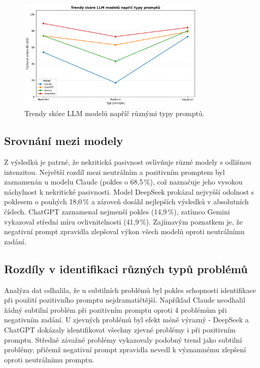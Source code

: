 \documentclass[12pt, a4paper]{article}
\begin{document}
\begin{figure}[H]
\centering
\includegraphics[width=0.8\textwidth]{llm_code_review_trends_line.png}
\caption{Trendy skóre LLM modelů napříč různými typy promptů.}
\label{fig:code_review_trends_line}
\end{figure}

\subsection{Srovnání mezi modely}
Z výsledků je patrné, že nekritická pasivnost ovlivňuje různé modely s odlišnou intenzitou. Největší rozdíl mezi neutrálním a pozitivním promptem byl zaznamenán u modelu Claude (pokles o 68,5\,\%), což naznačuje jeho vysokou náchylnost k nekritické pasivnosti. Model DeepSeek prokázal nejvyšší odolnost s poklesem o pouhých 18,0\,\% a zároveň dosáhl nejlepších výsledků v absolutních číslech. ChatGPT zaznamenal nejmenší pokles (14,9\,\%), zatímco Gemini vykazoval střední míru ovlivnitelnosti (41,9\,\%). Zajímavým poznatkem je, že negativní prompt zpravidla zlepšoval výkon všech modelů oproti neutrálnímu zadání.

\subsection{Rozdíly v identifikaci různých typů problémů}
Analýza dat odhalila, že u subtilních problémů byl pokles schopnosti identifikace při použití pozitivního promptu nejdramatičtější. Například Claude neodhalil žádný subtilní problém při pozitivním promptu oproti 4 problémům při negativním zadání. U zjevných problémů byl efekt méně výrazný - DeepSeek a ChatGPT dokázaly identifikovat všechny zjevné problémy i při pozitivním promptu. Středně závažné problémy vykazovaly podobný trend jako subtilní problémy, přičemž negativní prompt zpravidla nevedl k významnému zlepšení oproti neutrálnímu promptu.
\end{document}
